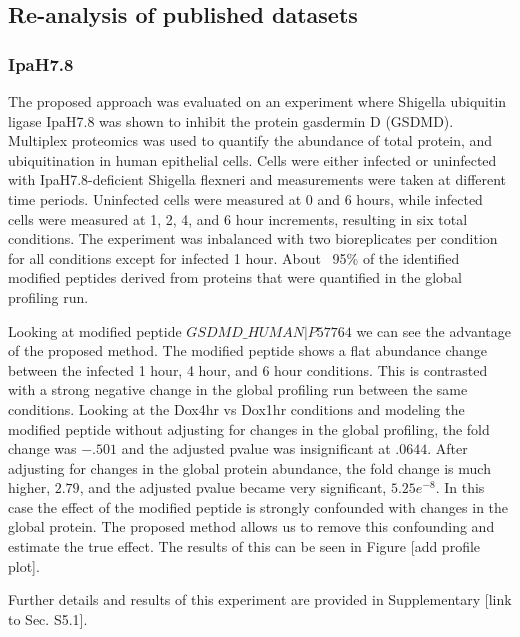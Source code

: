 \documentclass[mcp]{article}
\numberwithin{figure}{section} %
\numberwithin{table}{section}
\def\todo#1{{\color{red}[#1]}}
\begin{document}
\subsection*{Re-analysis of published datasets}

\subsubsection*{IpaH7.8}

The proposed approach was evaluated on an experiment where Shigella ubiquitin ligase IpaH7.8 was shown to inhibit the protein gasdermin D (GSDMD).\cite{LUCHETTI2021} Multiplex proteomics was used to quantify the abundance of total protein, and ubiquitination in human epithelial cells. Cells were either infected or uninfected with IpaH7.8-deficient Shigella flexneri and measurements were taken at different time periods. Uninfected cells were measured at 0 and 6 hours, while infected cells were measured at 1, 2, 4, and 6 hour increments, resulting in six total conditions. The experiment was inbalanced with two bioreplicates per condition for all conditions except for infected 1 hour. About ~95\% of the identified modified peptides derived from proteins that were quantified in the global profiling run.

Looking at modified peptide $GSDMD\_HUMAN|P57764$ we can see the advantage of the proposed method. The modified peptide shows a flat abundance change between the infected 1 hour, 4 hour, and 6 hour conditions. This is contrasted with a strong negative change in the global profiling run between the same conditions. Looking at the Dox4hr vs Dox1hr conditions and modeling the modified peptide without adjusting for changes in the global profiling, the fold change was $-.501$ and the adjusted pvalue was insignificant at $.0644$. After adjusting for changes in the global protein abundance, the fold change is much higher, $2.79$, and the adjusted pvalue became very significant, $5.25e^{-8}$. In this case the effect of the modified peptide is strongly confounded with changes in the global protein. The proposed method allows us to remove this confounding and estimate the true effect. The results of this can be seen in Figure \todo{add profile plot}. 

Further details and results of this experiment are provided in Supplementary \todo{link to Sec. S5.1}. 
\end{document}
